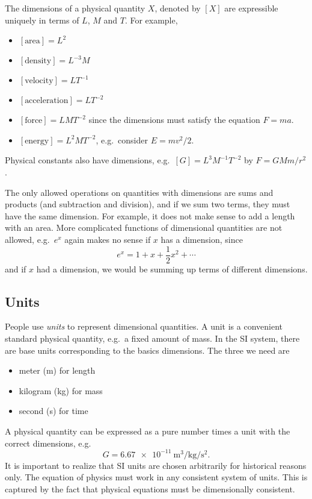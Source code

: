 \documentclass[a4paper]{article}
\begin{document}
The dimensions of a physical quantity $X$, denoted by $[X]$ are expressible uniquely in terms of $L$, $M$ and $T$. For example,
\begin{itemize}
  \item $[\text{area}] = L^2$
  \item $[\text{density}] = L^{-3} M$
  \item $[\text{velocity}] = LT^{-1}$
  \item $[\text{acceleration}] = LT^{-2}$
  \item $[\text{force}] = LMT^{-2}$ since the dimensions must satisfy the equation $F = ma$.
  \item $[\text{energy}] = L^2MT^{-2}$, e.g.\ consider $E = mv^2/2$.
\end{itemize}

Physical constants also have dimensions, e.g.\ $[G] = L^3M^{-1}T^{-2}$ by $F = GMm/r^2$.

The only allowed operations on quantities with dimensions are sums and products (and subtraction and division), and if we sum two terms, they must have the same dimension. For example, it does not make sense to add a length with an area. More complicated functions of dimensional quantities are not allowed, e.g.\ $e^{x}$ again makes no sense if $x$ has a dimension, since
\[
  e^x = 1 + x + \frac{1}{2}x^2 + \cdots
\]
and if $x$ had a dimension, we would be summing up terms of different dimensions.
\subsection{Units}
People use \emph{units} to represent dimensional quantities. A unit is a convenient standard physical quantity, e.g.\ a fixed amount of mass. In the SI system, there are base units corresponding to the basics dimensions. The three we need are
\begin{itemize}
  \item meter (m) for length
  \item kilogram (kg) for mass
  \item second (s) for time
\end{itemize}
A physical quantity can be expressed as a pure number times a unit with the correct dimensions, e.g.
\[
  G = \SI{6.67e-11}{\meter\cubed\per\kilogram\per\second\squared}.
\]
It is important to realize that SI units are chosen arbitrarily for historical reasons only. The equation of physics must work in any consistent system of units. This is captured by the fact that physical equations must be dimensionally consistent.
\end{document}
